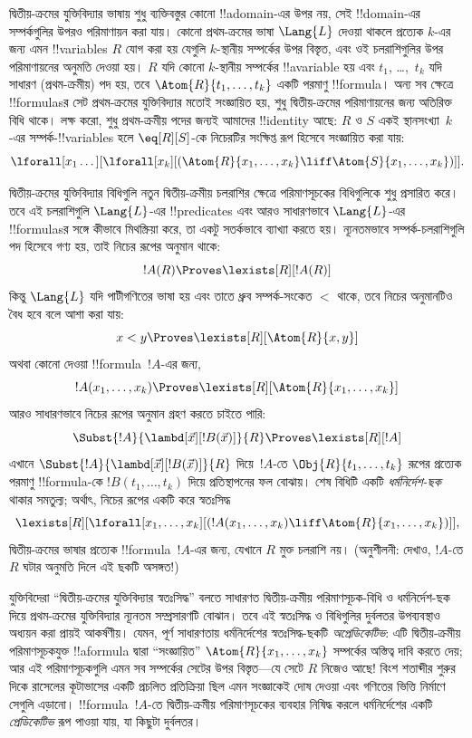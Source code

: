 \documentclass[../../../include/open-logic-section]{subfiles}
\begin{document}


দ্বিতীয়-ক্রমের যুক্তিবিদ্যার ভাষায় শুধু ব্যক্তিবস্তুর কোনো
!!a{domain}-এর উপর নয়, সেই !!{domain}-এর সম্পর্কগুলির উপরও পরিমাণায়ন
করা যায়। কোনো প্রথম-ক্রমের ভাষা $\Lang{L}$ দেওয়া থাকলে প্রত্যেক
$k$-এর জন্য এমন !!{variable}s $R$ যোগ করা হয় যেগুলি $k$-স্থানীয়
সম্পর্কের উপর বিস্তৃত, এবং ওই চলরাশিগুলির উপর পরিমাণায়নের অনুমতি দেওয়া
হয়। $R$ যদি কোনো $k$-স্থানীয় সম্পর্কের !!a{variable} হয় এবং
$t_1$, \dots,~$t_k$ যদি সাধারণ (প্রথম-ক্রমীয়) পদ হয়, তবে
$\Atom{R}{t_1,\dots,t_k}$ একটি পরমাণু !!{formula}। অন্য সব ক্ষেত্রে
!!{formula}sর সেট প্রথম-ক্রমের যুক্তিবিদ্যার মতোই সংজ্ঞায়িত হয়,
শুধু দ্বিতীয়-ক্রমের পরিমাণায়নের জন্য অতিরিক্ত বিধি থাকে। লক্ষ করো,
শুধু প্রথম-ক্রমীয় পদের জন্যই আমাদের !!{identity} আছে: $R$ ও $S$ একই
স্থানসংখ্যা~$k$-এর সম্পর্ক-!!{variable}s হলে $\eq[R][S]$-কে নিচেরটির
সংক্ষিপ্ত রূপ হিসেবে সংজ্ঞায়িত করা যায়:
\[
\lforall[x_1 \dots][\lforall[x_k][(\Atom{R}{x_1, \dots, x_k} \liff
  \Atom{S}{x_1, \dots, x_k})]].
\]

দ্বিতীয়-ক্রমের যুক্তিবিদ্যার বিধিগুলি নতুন দ্বিতীয়-ক্রমীয় চলরাশির
ক্ষেত্রে পরিমাণসূচকের বিধিগুলিকে শুধু প্রসারিত করে। তবে এই চলরাশিগুলি
$\Lang{L}$-এর !!{predicate}s এবং আরও সাধারণভাবে $\Lang{L}$-এর
!!{formula}sর সঙ্গে কীভাবে মিথস্ক্রিয়া করে, তা একটু সতর্কভাবে
ব্যাখ্যা করতে হয়। ন্যূনতমভাবে সম্পর্ক-চলরাশিগুলি পদ হিসেবে গণ্য হয়,
তাই নিচের রূপের অনুমান থাকে:
\[
!A(R) \Proves \lexists[R][!A(R)]
\]
কিন্তু $\Lang{L}$ যদি পাটীগণিতের ভাষা হয় এবং তাতে ধ্রুব সম্পর্ক-সংকেত
$<$ থাকে, তবে নিচের অনুমানটিও বৈধ হবে বলে আশা করা যায়:
\[
x < y \Proves \lexists[R][\Atom{R}{x,y}]
\]
অথবা কোনো দেওয়া !!{formula}~$!A$-এর জন্য,
\[
!A(x_1, \dots, x_k) \Proves \lexists[R][\Atom{R}{x_1,\dots,x_k}]
\]
আরও সাধারণভাবে নিচের রূপের অনুমান গ্রহণ করতে চাইতে পারি:
\[
\Subst{!A}{\lambd[\vec x][!B(\vec x)]}{R} \Proves
\lexists[R][!A]
\]
এখানে $\Subst{!A}{\lambd[\vec x][!B(\vec x)]}{R}$ দিয়ে~$!A$-তে
$\Obj{R}{t_1,\dots,t_k}$ রূপের প্রত্যেক পরমাণু !!{formula}-কে
$!B(t_1, \dots, t_k)$ দিয়ে প্রতিস্থাপনের ফল বোঝায়। শেষ বিধিটি একটি
{\em ধর্মনির্দেশ-ছক} থাকার সমতুল্য; অর্থাৎ, নিচের রূপের একটি করে
স্বতঃসিদ্ধ
\[
\lexists[R][\lforall[x_1, \dots, x_k][(!A(x_1, \dots, x_k) \liff
\Atom{R}{x_1, \dots, x_k})]],
\]
দ্বিতীয়-ক্রমের ভাষার প্রত্যেক !!{formula}~$!A$-এর জন্য, যেখানে $R$
মুক্ত চলরাশি নয়। (অনুশীলনী: দেখাও, $!A$-তে $R$ ঘটার অনুমতি দিলে এই
ছকটি অসঙ্গত!)

যুক্তিবিদেরা “দ্বিতীয়-ক্রমের যুক্তিবিদ্যার স্বতঃসিদ্ধ” বলতে সাধারণত
দ্বিতীয়-ক্রমীয় পরিমাণসূচক-বিধি ও ধর্মনির্দেশ-ছক দিয়ে প্রথম-ক্রমের
যুক্তিবিদ্যার ন্যূনতম সম্প্রসারণটি বোঝান। তবে এই স্বতঃসিদ্ধ ও বিধিগুলির
দুর্বলতর উপব্যবস্থাও অধ্যয়ন করা প্রায়ই আকর্ষণীয়। যেমন, পূর্ণ
সাধারণতায় ধর্মনির্দেশের স্বতঃসিদ্ধ-ছকটি \emph{অপ্রেডিকেটিভ}: এটি
দ্বিতীয়-ক্রমীয় পরিমাণসূচকযুক্ত !!a{formula} দ্বারা “সংজ্ঞায়িত”
$\Atom{R}{x_1, \dots, x_k}$ সম্পর্কের অস্তিত্ব দাবি করতে দেয়; আর এই
পরিমাণসূচকগুলি এমন সব সম্পর্কের সেটের উপর বিস্তৃত---যে সেটে $R$
নিজেও আছে!{} বিংশ শতাব্দীর শুরুর দিকে রাসেলের কূটাভাসের একটি প্রচলিত
প্রতিক্রিয়া ছিল এমন সংজ্ঞাকেই দোষ দেওয়া এবং গণিতের ভিত্তি নির্মাণে
সেগুলি এড়ানো। !!{formula}~$!A$-তে দ্বিতীয়-ক্রমীয় পরিমাণসূচকের ব্যবহার
নিষিদ্ধ করলে ধর্মনির্দেশের একটি {\em প্রেডিকেটিভ} রূপ পাওয়া যায়, যা
কিছুটা দুর্বলতর।
\end{document}
